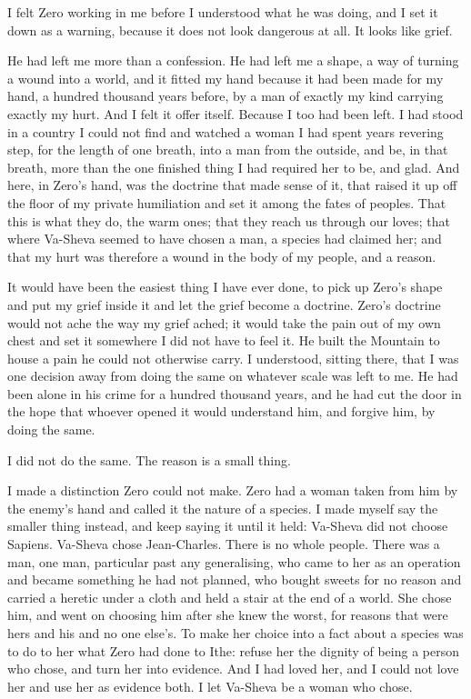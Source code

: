 \ornament

I felt Zero working in me before I understood what he was doing, and I set it down as a warning, because it does not look dangerous at all. It looks like grief.\par

He had left me more than a confession. He had left me a shape, a way of turning a wound into a world, and it fitted my hand because it had been made for my hand, a hundred thousand years before, by a man of exactly my kind carrying exactly my hurt. And I felt it offer itself. Because I too had been left. I had stood in a country I could not find and watched a woman I had spent years revering step, for the length of one breath, into a man from the outside, and be, in that breath, more than the one finished thing I had required her to be, and glad. And here, in Zero's hand, was the doctrine that made sense of it, that raised it up off the floor of my private humiliation and set it among the fates of peoples. That this is what they do, the warm ones; that they reach us through our loves; that where Va-Sheva seemed to have chosen a man, a species had claimed her; and that my hurt was therefore a wound in the body of my people, and a reason.\par

It would have been the easiest thing I have ever done, to pick up Zero's shape and put my grief inside it and let the grief become a doctrine. Zero's doctrine would not ache the way my grief ached; it would take the pain out of my own chest and set it somewhere I did not have to feel it. He built the Mountain to house a pain he could not otherwise carry. I understood, sitting there, that I was one decision away from doing the same on whatever scale was left to me. He had been alone in his crime for a hundred thousand years, and he had cut the door in the hope that whoever opened it would understand him, and forgive him, by doing the same.\par

\ornament

I did not do the same. The reason is a small thing.\par

I made a distinction Zero could not make. Zero had a woman taken from him by the enemy's hand and called it the nature of a species. I made myself say the smaller thing instead, and keep saying it until it held: Va-Sheva did not choose Sapiens. Va-Sheva chose Jean-Charles. There is no whole people. There was a man, one man, particular past any generalising, who came to her as an operation and became something he had not planned, who bought sweets for no reason and carried a heretic under a cloth and held a stair at the end of a world. She chose him, and went on choosing him after she knew the worst, for reasons that were hers and his and no one else's. To make her choice into a fact about a species was to do to her what Zero had done to Ithe: refuse her the dignity of being a person who chose, and turn her into evidence. And I had loved her, and I could not love her and use her as evidence both. I let Va-Sheva be a woman who chose.\par

